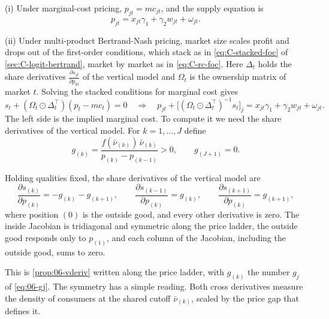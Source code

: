 (i) Under marginal-cost pricing, $p_{jt} = mc_{jt}$, and the supply equation is
\begin{equation}\label{eq:C-vsupply-mcp}
  p_{jt} = x_{jt}\gamma_1 + \gamma_2 w_{jt} + \omega_{jt}.
\end{equation}

(ii) Under multi-product Bertrand-Nash pricing, market size scales profit and drops out of the first-order
conditions, which stack as in \eqref{eq:C-stacked-foc} of \cref{sec:C-logit-bertrand}, market by market as in
\eqref{eq:C-rc-foc}. Here $\Delta_t$ holds the share derivatives $\frac{\partial s_{jt}}{\partial p_{kt}}$ of the
vertical model and $\Omega_t$ is the ownership matrix of market $t$. Solving the stacked conditions for marginal cost
gives
\begin{equation}\label{eq:C-vsupply-nash}
  s_t + (\Omega_t \odot \Delta_t^\top)(p_t - mc_t) = 0
  \quad\Longrightarrow\quad
  p_{jt} + \big[(\Omega_t \odot \Delta_t^\top)^{-1}s_t\big]_j = x_{jt}\gamma_1 + \gamma_2 w_{jt} + \omega_{jt}.
\end{equation}
The left side is the implied marginal cost. To compute it we need the share derivatives of the vertical model. For
$k = 1, \dots, J$ define
\begin{equation}\label{eq:C-vg}
  g_{(k)} = \frac{f(\bar\nu_{(k)})\,\bar\nu_{(k)}}{p_{(k)} - p_{(k-1)}} > 0, \qquad g_{(J+1)} = 0 .
\end{equation}

\begin{proposition}\label{prop:C-vjac}
Holding qualities fixed, the share derivatives of the vertical model are
\[
  \frac{\partial s_{(k)}}{\partial p_{(k)}} = -g_{(k)} - g_{(k+1)}, \qquad
  \frac{\partial s_{(k-1)}}{\partial p_{(k)}} = g_{(k)}, \qquad
  \frac{\partial s_{(k+1)}}{\partial p_{(k)}} = g_{(k+1)},
\]
where position $(0)$ is the outside good, and every other derivative is zero. The inside Jacobian is tridiagonal and
symmetric along the price ladder, the outside good responds only to $p_{(1)}$, and each column of the Jacobian,
including the outside good, sums to zero.
\end{proposition}

This is \cref{prop:06-vderiv} written along the price ladder, with $g_{(k)}$ the number $g_j$ of \eqref{eq:06-gj}. The
symmetry has a simple reading. Both cross derivatives measure the density of consumers at the shared cutoff
$\bar\nu_{(k)}$, scaled by the price gap that defines it.

